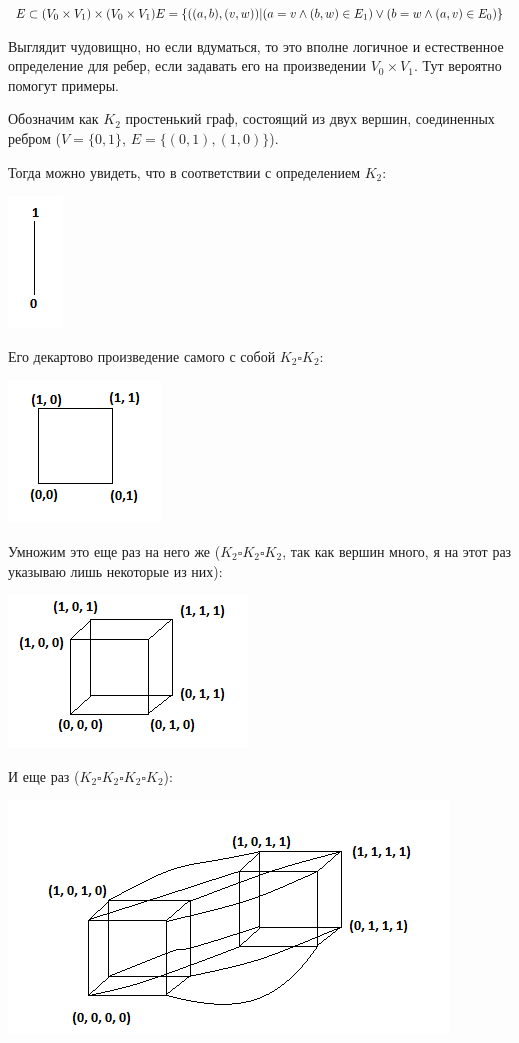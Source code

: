 $E \subset (V_0\times V_1)\times(V_0\times V_1) \\ E = \{((a, b), (v, w))|(a=v \wedge (b, w)\in E_1)\vee(b=w \wedge (a, v)\in E_0)\}$

Выглядит чудовищно, но если вдуматься, то это вполне логичное и естественное определение для ребер, если задавать его на произведении $V_0 \times V_1$. Тут вероятно помогут примеры.

Обозначим как $K_2$ простенький граф, состоящий из двух вершин, соединенных ребром ($V = \{0, 1\}$, $E = \{(0, 1), (1, 0)\}$).

Тогда можно увидеть, что в соответствии с определением $K_2$:

\includegraphics{k2.png}

Его декартово произведение самого с собой $K_2 \square K_2$:

\includegraphics{k22.png}

Умножим это еще раз на него же ($K_2 \square K_2 \square K_2$, так как вершин много, я на этот раз указываю лишь некоторые из них):

\includegraphics{k23.png}

И еще раз ($K_2 \square K_2 \square K_2 \square K_2$):

\includegraphics{k24.png}

